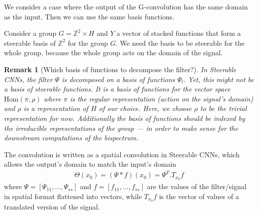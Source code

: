 \documentclass{article}
\newtheorem{remark}{Remark}
\begin{document}
We consider a case where the output of the G-convolution has the same domain as the input. Then we can use the same basis functions.

Consider a group $G = \mathbb{Z}^2 \times H$ and $Y$ a vector of stacked functions that form a steerable basis of $\mathbb{Z}^2$ for the group $G$. We need the basis to be steerable for the whole group, because the whole group acts on the domain of the signal.

\begin{remark}[Which basis of functions to decompose the filter?]
    In Steerable CNNs, the filter $\Psi$ is decomposed on a basis of functions $\Psi_l$. Yet, this might not be a basis of steerable functions. It is a basis of functions for the vector space $\text{Hom}(\pi, \rho)$ where $\pi$ is the regular representation (action on the signal's domain) and $\rho$ is a representation of $H$ of our choice. Here, we choose $\rho$ to be the trivial representation for now.
    Additionally the basis of functions should be indexed by the irreducible representations of the group — in order to make sense for the downstream computations of the bispectrum.
\end{remark}

The convolution is written as a spatial convolution in Steerable CNNs, which allows the output's domain to match the input's domain
\begin{align*}
    \Theta(x_0) = (\Psi \ast f) (x_0) = \Psi^T. T_{x_0}f
\end{align*}
where $\Psi = [\Psi_{11}, ..., \Psi_{ss}]$ and $f = [f_{11}, ..., f_{ss}]$ are the values of the filter/signal in spatial format flattened into vectors, while $T_{x_0}f$ is the vector of values of a translated version of the signal.
\end{document}
